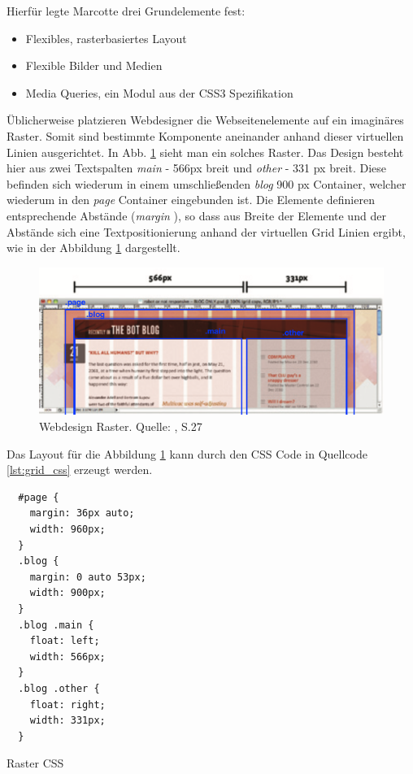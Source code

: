 Hierfür legte Marcotte drei Grundelemente fest:

\begin{itemize}
 \item Flexibles, rasterbasiertes Layout
 \item Flexible Bilder und Medien
 \item Media Queries, ein Modul aus der CSS3 Spezifikation
\end{itemize}

Üblicherweise platzieren Webdesigner die Webseitenelemente auf ein imaginäres Raster. Somit sind bestimmte Komponente aneinander anhand dieser virtuellen Linien ausgerichtet. In Abb. \ref{fig:grid} sieht man ein solches Raster. Das Design besteht hier aus zwei Textspalten \emph{main} - 566px breit und \emph{other} - 331 px breit. Diese befinden sich wiederum in einem umschließenden  \emph{blog} 900 px Container, welcher wiederum in den \emph{page} Container eingebunden ist. Die Elemente definieren entsprechende Abstände (\emph{margin} ), so dass aus Breite der Elemente und der Abstände sich eine Textpositionierung anhand der virtuellen Grid Linien ergibt, wie in der Abbildung \ref{fig:grid} dargestellt.

\begin{figure}[htp]     %
\centering
\includegraphics[width=1.0\textwidth]{images/grid}
\caption{Webdesign Raster. Quelle: \cite{Marcotte:2011}, S.27}\label{fig:grid}
\end{figure}

Das Layout für die Abbildung \ref{fig:grid} kann durch den CSS Code in Quellcode \ref{lst:grid_css} erzeugt werden.

\begin{listing}[H]
\begin{verbatim}
  #page {
    margin: 36px auto;
    width: 960px;
  }
  .blog {
    margin: 0 auto 53px;
    width: 900px;
  }
  .blog .main {
    float: left;
    width: 566px;
  }
  .blog .other {
    float: right;
    width: 331px;
  }
\end{verbatim}
\caption{Raster CSS}
\label{lst:grid_css}
\end{listing}

